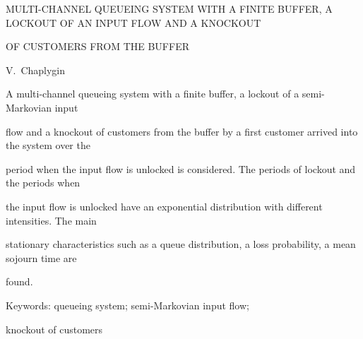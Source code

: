 MULTI-CHANNEL QUEUEING SYSTEM WITH A FINITE BUFFER, A LOCKOUT OF AN INPUT FLOW AND A KNOCKOUT


OF CUSTOMERS FROM THE BUFFER





V.~Chaplygin





A multi-channel queueing system with a finite buffer, a lockout of a semi-Markovian input


flow and a knockout of customers from the buffer by a first customer arrived into the system over the


period when the input flow is unlocked is considered. The periods of lockout and the periods when


the input flow is unlocked have an exponential distribution with different intensities. The main


stationary characteristics such as a queue distribution, a loss probability, a mean sojourn time are


found.





Keywords: queueing system; semi-Markovian input flow;


knockout of customers





